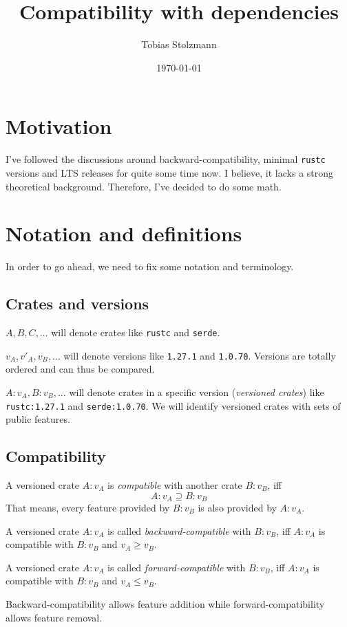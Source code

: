 \documentclass{article}
\title{Compatibility with dependencies}
\author{Tobias Stolzmann}
\date{\today}
\begin{document}
    \maketitle

    \section{Motivation}
    I've followed the discussions around backward-compatibility, minimal \texttt{rustc} versions and LTS releases for quite some time now. I believe, it lacks a strong theoretical background. Therefore, I've decided to do some math.

    \section{Notation and definitions}
    In order to go ahead, we need to fix some notation and terminology.

    \subsection{Crates and versions}
    $A, B, C, \ldots$ will denote crates like \texttt{rustc} and \texttt{serde}.

    $v_A, v'_A, v_B, \ldots$ will denote versions like \texttt{1.27.1} and \texttt{1.0.70}. Versions are totally ordered and can thus be compared.

    $A:v_A, B:v_B, \ldots$ will denote crates in a specific version (\emph{versioned crates}) like \texttt{rustc:1.27.1} and \texttt{serde:1.0.70}. We will identify versioned crates with sets of public features.

    \subsection{Compatibility}
    A versioned crate $A:v_A$ is \emph{compatible} with another crate $B:v_B$, iff
    $$
    A:v_A \supseteq B:v_B
    $$
    That means, every feature provided by $B:v_B$ is also provided by $A:v_A$.

    A versioned crate $A:v_A$ is called \emph{backward-compatible} with $B:v_B$, iff $A:v_A$ is compatible with $B:v_B$ and $v_A \geq v_B$.

    A versioned crate $A:v_A$ is called \emph{forward-compatible} with $B:v_B$, iff $A:v_A$ is compatible with $B:v_B$ and $v_A \leq v_B$.

    Backward-compatibility allows feature addition while forward-compatibility allows feature removal.
\end{document}
